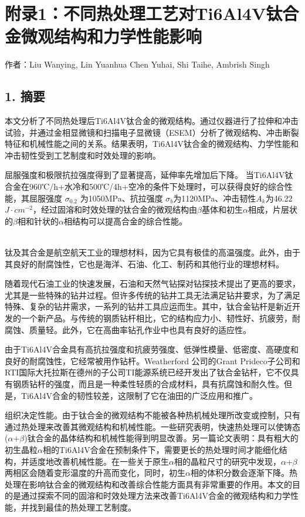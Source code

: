 \chapter{附录1：不同热处理工艺对Ti6Al4V钛合金微观结构和力学性能影响}
\begin{center}
	作者：Liu Wanying, Lin Yuanhua Chen Yuhai, Shi Taihe, Ambrish Singh\\
\end{center}
\section*{1. 摘要}
本文分析了不同热处理后Ti6Al4V钛合金的微观结构。通过仪器进行了拉伸和冲击试验，并通过金相显微镜和扫描电子显微镜（ESEM）分析了微观结构、冲击断裂特征和机械性能之间的关系。结果表明，Ti6Al4V钛合金的微观结构、力学性能和冲击韧性受到工艺制度和时效处理的影响。

屈服强度和极限抗拉强度得到了显著提高，延伸率先增加后下降。
当Ti6Al4V钛合金在960℃/h+水冷和500℃/4h+空冷的条件下处理时，可以获得良好的综合性能，其屈服强度 $\sigma_{0.2}$ 为1050MPa、抗拉强度 $\sigma_b$为1120MPa、冲击韧性$A_k$为46.22 $J·cm^{-2}$，经过固溶和时效处理的钛合金的微观结构由$\beta$基体和初生$\alpha$相成，片层状的$\beta$相和针状的$\alpha$相结构可以提高合金的综合性能。

\noindent{}\\

钛及其合金是航空航天工业的理想材料，因为它具有极佳的高温强度。此外，由于其良好的耐腐蚀性，它也是海洋、石油、化工、制药和其他行业的理想材料。

随着现代石油工业的快速发展，石油和天然气钻探对钻探技术提出了更高的要求，尤其是一些特殊的钻井过程。但许多传统的钻井工具无法满足钻井要求，为了满足特殊、复杂的钻井需求，一系列的钻井工具应运而生。其中，钛合金钻杆是新近开发的一个新产品。与传统的钢质钻杆相比，它的结构应力小、韧性好、抗疲劳，耐腐蚀、质量轻。此外，它在高曲率钻孔作业中也具有良好的适应性。

由于Ti6Al4V合金具有高抗拉强度和抗疲劳强度、低弹性模量、低密度、高硬度和良好的耐腐蚀性，它经常被用作钻杆。Weatherford 公司的Grant Prideco子公司和RTI国际大托拉斯在德州的子公司TI能源系统已经开发出了钛合金钻杆，它不仅具有钢质钻杆的强度，而且是一种柔性轻质的合成材料，具有抗腐蚀和耐久性。但是，Ti6Al4V合金的韧性较差，这限制了它在油田的广泛应用和推广。

组织决定性能。由于钛合金的微观结构不能被各种热机械处理所改变或控制，只有通过热处理来改善其微观结构和机械性能。一些研究表明，快速热处理可以使铸态($\alpha$+$\beta$)钛合金的晶体结构和机械性能得到明显改善。另一篇论文表明：具有粗大的初生晶粒$\alpha$相的Ti6Al4V合金在预制条件下，需要更长的热处理时间才能细化结构，并适度地改善机械性能。在一些关于原生$\alpha$相的晶粒尺寸的研究中发现，$\alpha$+$\beta$两相区会随着变形温度的升高而变化，同时，初生$\alpha$相的体积分数会逐渐下降。热处理在影响钛合金的微观结构和改善综合性能方面具有非常重要的作用。本文的目的是通过探索不同的固溶和时效处理方法来改善Ti6Al4V合金的微观结构和力学性能，并找到最佳的热处理工艺制度。

